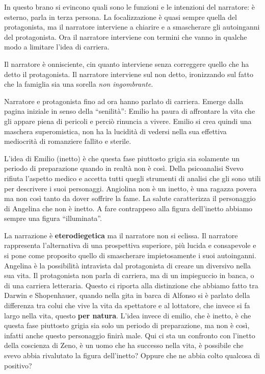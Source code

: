 
In questo brano si evincono quali sono le funzioni e le intenzioni del narratore: è esterno, parla in terza persona. La focalizzazione è quasi sempre quella del protagonista, ma il narratore interviene a chiarire e a smascherare gli autoinganni del protagonista. Ora il narratore interviene con termini che vanno in qualche modo a limitare l'idea di carriera.

Il narratore è onnisciente, cin quanto interviene senza correggere quello che ha detto il protagonista. Il narratore interviene sul non detto, ironizzando sul fatto che la famiglia sia una sorella \textit{non ingombrante}.

Narratore e protagonista fino ad ora hanno parlato di carriera.
Emerge dalla pagina iniziale in senso della “senilità”: Emilio ha paura di affrontare la vita che gli appare piena di pericoli e perciò rinuncia a vivere. Emilio si crea quindi una maschera superomistica, non ha la lucidità di vedersi nella sua effettiva mediocrità di romanziere fallito e sterile.

L’idea di Emilio (inetto) è che questa fase piuttosto grigia sia solamente un periodo di preparazione quando in realtà non è così.
Della psicoanalisi Svevo rifiuta l’aspetto medico e accetta tutti quegli strumenti di analisi che gli sono utili per descrivere i suoi personaggi. Angiolina non è un inetto, è una ragazza povera ma non così tanto da dover soffrire la fame. La salute caratterizza il personaggio di Angelina che non è inetto. A fare contrappeso alla figura dell’inetto abbiamo sempre una figura “illuminata”.

La narrazione è \textbf{eterodiegetica} ma il narratore non si eclissa. Il narratore rappresenta l’alternativa di una prospettiva superiore, più lucida e consapevole e si pone come proposito quello di smascherare impietosamente i suoi autoinganni.
Angelina è la possibilità intravista dal protagonista di creare un diversivo nella sua vita. Il protagonista non parla di carriera, ma di un impieguccio in banca, o di una carriera letteraria.
Questo ci riporta alla distinzione che abbiamo fatto tra Darwin e Shopenhauer, quando nella gita in barca di Alfonso si è parlato della differenza tra colui che vive la vita da spettatore e al lottatore, che invece si fa largo nella vita, questo \textbf{per natura}.
L’idea invece di emilio, che è inetto, è che questa fase piuttosto grigia sia solo un periodo di preparazione, ma non è così, infatti anche questo personaggio finirà male.
Qui ci sta un  confronto con l’inetto della coscienza di Zeno, è un uomo che ha successo nella vita, è possibile che svevo abbia rivalutato la figura dell’inetto?  Oppure che ne abbia colto qualcosa di positivo?

